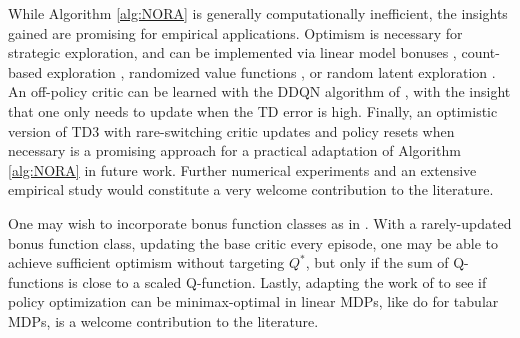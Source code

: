 While Algorithm \ref{alg:NORA} is generally computationally inefficient, the insights gained are promising for empirical applications. 
Optimism is necessary for strategic exploration, and can be implemented via linear model bonuses \citet{agarwal2020pcpgpolicycoverdirected}, count-based exploration \citet{martin2017countbasedexplorationfeaturespace}, randomized value functions \citet{osband2019deepexplorationrandomizedvalue}, or random latent exploration \citet{mahankali2024randomlatentexplorationdeep}. An off-policy critic can be learned with the DDQN algorithm of \citet{vanhasselt2015deepreinforcementlearningdouble}, with the insight that one only needs to update when the TD error is high. Finally, an optimistic version of TD3 \citep{fujimoto2018addressing} with rare-switching critic updates and policy resets when necessary is a promising approach for a practical adaptation of Algorithm \ref{alg:NORA} in future work. Further numerical experiments and an extensive empirical study would constitute a very welcome contribution to the literature.

One may wish to incorporate bonus function classes as in \cite{agarwal2023vo, zhao2023nearlyoptimallowswitchingalgorithm}. With a rarely-updated bonus function class, updating the base critic every episode, one may be able to achieve sufficient optimism without targeting $Q^*$, but only if the sum of Q-functions is close to a scaled Q-function. 
Lastly, adapting the work of \citet{he2023nearly} to see if policy optimization can be minimax-optimal in linear MDPs, like \citet{wu2022nearlyoptimalpolicyoptimization} do for tabular MDPs, is a welcome contribution to the literature. 


